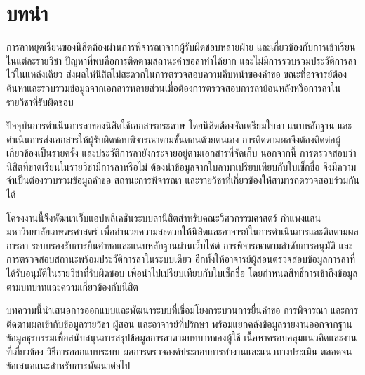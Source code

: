 \section{บทนำ}
การลาหยุดเรียนของนิสิตต้องผ่านการพิจารณาจากผู้รับผิดชอบหลายฝ่าย
และเกี่ยวข้องกับการเข้าเรียนในแต่ละรายวิชา
ปัญหาที่พบคือการติดตามสถานะคำขอลาทำได้ยาก
และไม่มีการรวบรวมประวัติการลาไว้ในแหล่งเดียว
ส่งผลให้นิสิตไม่สะดวกในการตรวจสอบความคืบหน้าของคำขอ
ขณะที่อาจารย์ต้องค้นหาและรวบรวมข้อมูลจากเอกสารหลายส่วนเมื่อต้องการตรวจสอบการลาย้อนหลังหรือการลาในรายวิชาที่รับผิดชอบ

ปัจจุบันการดำเนินการลาของนิสิตใช้เอกสารกระดาษ
โดยนิสิตต้องจัดเตรียมใบลา แนบหลักฐาน
และดำเนินการส่งเอกสารให้ผู้รับผิดชอบพิจารณาตามขั้นตอนด้วยตนเอง
การติดตามผลจึงต้องติดต่อผู้เกี่ยวข้องเป็นรายครั้ง
และประวัติการลายังกระจายอยู่ตามเอกสารที่จัดเก็บ \cite{proposal}
นอกจากนี้ การตรวจสอบว่านิสิตที่ขาดเรียนในรายวิชามีการลาหรือไม่
ต้องนำข้อมูลจากใบลามาเปรียบเทียบกับใบเช็กชื่อ
จึงมีความจำเป็นต้องรวบรวมข้อมูลคำขอ สถานะการพิจารณา
และรายวิชาที่เกี่ยวข้องให้สามารถตรวจสอบร่วมกันได้

โครงงานนี้จึงพัฒนาเว็บแอปพลิเคชันระบบลานิสิตสำหรับคณะวิศวกรรมศาสตร์
กำแพงแสน มหาวิทยาลัยเกษตรศาสตร์
เพื่ออำนวยความสะดวกให้นิสิตและอาจารย์ในการดำเนินการและติดตามผลการลา
ระบบรองรับการยื่นคำขอและแนบหลักฐานผ่านเว็บไซต์
การพิจารณาตามลำดับการอนุมัติ
และการตรวจสอบสถานะพร้อมประวัติการลาในระบบเดียว
อีกทั้งให้อาจารย์ผู้สอนตรวจสอบข้อมูลการลาที่ได้รับอนุมัติในรายวิชาที่รับผิดชอบ
เพื่อนำไปเปรียบเทียบกับใบเช็กชื่อ
โดยกำหนดสิทธิ์การเข้าถึงข้อมูลตามบทบาทและความเกี่ยวข้องกับนิสิต

บทความนี้นำเสนอการออกแบบและพัฒนาระบบที่เชื่อมโยงกระบวนการยื่นคำขอ
การพิจารณา และการติดตามผลเข้ากับข้อมูลรายวิชา ผู้สอน
และอาจารย์ที่ปรึกษา
พร้อมแยกคลังข้อมูลรายงานออกจากฐานข้อมูลธุรกรรมเพื่อสนับสนุนการสรุปข้อมูลการลาตามบทบาทของผู้ใช้
เนื้อหาครอบคลุมแนวคิดและงานที่เกี่ยวข้อง วิธีการออกแบบระบบ
ผลการตรวจองค์ประกอบการทำงานและแนวทางประเมิน
ตลอดจนข้อเสนอแนะสำหรับการพัฒนาต่อไป \cite{repo}
